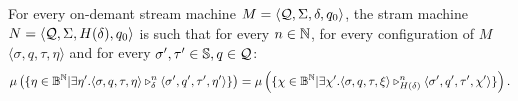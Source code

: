 

\begin{lemma}
  \label{lemma:SFPODtoSFP}
  For every on-demant stream machine $M = \langle \mathcal{Q}, \Sigma, \delta, q_0\rangle$, the stram machine $N = \langle \mathcal{Q}, \Sigma, H(\delta), q_0\rangle$ is such that for every $n \in \mathbb{N}$,
  for every configuration of $M$ $\langle \sigma, q, \tau, \eta\rangle$ and for
  every $\sigma', \tau' \in \mathbb{S}, q \in \mathcal{Q}$:
  $$
  \mu \left(\{\eta \in \mathbb{B}^{\mathbb{N}}| \exists \eta'. \langle \sigma, q, \tau, \eta\rangle\triangleright^{n}_{\delta} \langle \sigma', q', \tau', \eta'\rangle\}\right)
  =
  \mu \left(\{\chi \in \mathbb{B}^{\mathbb{N}}|  \exists \chi'. \langle \sigma, q, \tau, \xi\rangle\triangleright^{n}_{H(\delta)} \langle \sigma', q', \tau', \chi'\rangle\}\right).
  $$
\end{lemma}

